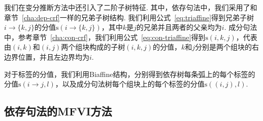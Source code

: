 我们在变分推断方法中还引入了二阶子树特征.
其中，依存句法中，我们采用了和章节~\ref{cha:dep-crf}一样的兄弟子树结构.
我们利用公式~\ref{eq:triaffine}得到兄弟子树$i\rightarrow \{k,j\}$的分值$\mathrm{s}(i\rightarrow\{k,j\})$，其中$k$是$j$的兄弟并且两者的父亲均为$i$.
成分句法中，参考章节~\ref{cha:con-crf}，我们利用公式~\ref{eq:con-triaffine}得到$\mathrm{s}(i,k,j)$，代表由$(i,k)$和$(i,j)$两个组块构成的子树$(i,k,j)$的分值，$k$和$j$分别是两个组块的右边界位置，并且左边界均为$i$.

对于标签的分值，我们利用Biaffine结构，分别得到依存树每条弧上的每个标签的分值$\mathrm{s}(i\rightarrow j,l)$，以及成分句法树每个组块上的每个标签的分值$\mathrm{s}((i,j),l)$.

\subsection{依存句法的MFVI方法}\label{sec:dep-vi}

